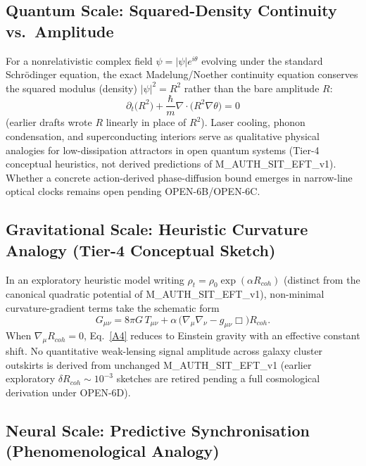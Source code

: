 \documentclass[american,11pt,letterpaper]{article}
\def\mathrm#1{#1}%
\def\texttt#1{#1}%
\def\emph#1{#1}%
\begin{document}
\subsection{Quantum Scale: Squared-Density Continuity vs.\ Amplitude}

For a nonrelativistic complex field $\psi = |\psi|e^{i\theta}$ evolving under the standard Schr\"odinger equation, the exact Madelung/Noether continuity equation conserves the \emph{squared modulus} (density) $|\psi|^2 = R^2$ rather than the bare amplitude $R$:
\begin{equation}
\partial_{t}\bigl(R^2\bigr)
   +\frac{\hbar}{m}
     \nabla\!\cdot\!\bigl(R^2\nabla\theta\bigr)
   = 0
\tag{A3}\label{A3}
\end{equation}
(earlier drafts wrote $R$ linearly in place of $R^2$). Laser cooling, phonon condensation, and superconducting interiors serve as qualitative physical analogies for low-dissipation attractors in open quantum systems (Tier-4 conceptual heuristics, not derived predictions of \texttt{M\_AUTH\_SIT\_EFT\_v1}). Whether a concrete action-derived phase-diffusion bound emerges in narrow-line optical clocks remains open pending \texttt{OPEN-6B}/\texttt{OPEN-6C}.

\subsection{Gravitational Scale: Heuristic Curvature Analogy (Tier-4 Conceptual Sketch)}

In an exploratory heuristic model writing $\rho_{t}= \rho_{0}\exp(\alpha R_{\mathrm{coh}})$ (distinct from the canonical quadratic potential of \texttt{M\_AUTH\_SIT\_EFT\_v1}), non-minimal curvature-gradient terms take the schematic form
\[
G_{\mu\nu}=8\pi G\,T_{\mu\nu}
+\alpha\,\bigl(\nabla_{\!\mu}\nabla_{\!\nu}-g_{\mu\nu}\Box\bigr)R_{\mathrm{coh}} .
\tag{A4}\label{A4}
\]
When $\nabla_{\mu}R_{\mathrm{coh}}=0$, Eq.~\eqref{A4} reduces to Einstein gravity with an effective constant shift. No quantitative weak-lensing signal amplitude across galaxy cluster outskirts is derived from unchanged \texttt{M\_AUTH\_SIT\_EFT\_v1} (earlier exploratory $\delta R_{\mathrm{coh}}\sim 10^{-3}$ sketches are retired pending a full cosmological derivation under \texttt{OPEN-6D}).

\subsection{Neural Scale: Predictive Synchronisation (Phenomenological Analogy)}
\end{document}
